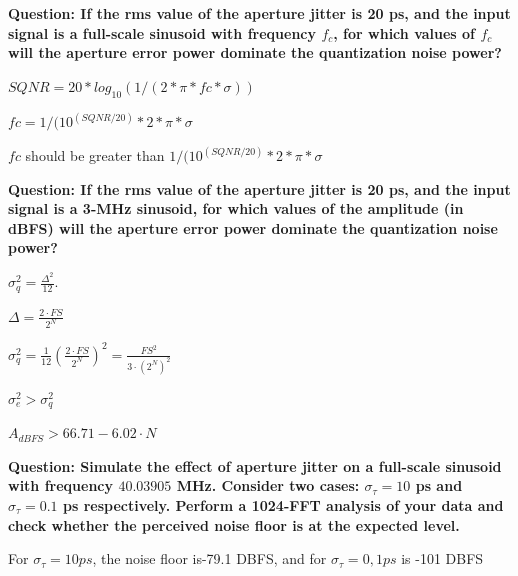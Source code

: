 \textbf{Question: If the rms value of the aperture jitter is 20 ps, and the input signal is a full-scale sinusoid with frequency $f_c$,
    for which values of $f_c$ will the aperture error power dominate the quantization noise power?
}
\vspace{0.5cm}

$SQNR = 20 * log_{10}(1 / (2*\pi*fc*\sigma))$

$fc = 1 / ( 10^(SQNR / 20) * 2*\pi*\sigma $

$fc$ should be greater than $1 / ( 10^(SQNR / 20) * 2*\pi*\sigma $

\vspace{1cm}
\textbf{Question: If the rms value of the aperture jitter is 20 ps, and the input signal is a 3-MHz sinusoid, for which values of the amplitude
    (in dBFS) will the aperture error power dominate the quantization noise power?
}
\vspace{0.5cm}

$\sigma_{q}^{2}=\frac{\Delta^{2}}{12}$.

$\Delta=\frac{2\cdot FS}{2^{N}}$

$\sigma_{q}^{2} = \frac{1}{12} \left( \frac{2 \cdot FS}{2^N} \right)^2 = \frac{FS^2}{3 \cdot (2^N)^2}$

$\sigma_e^2 > \sigma_q^2$

$A_{dBFS} > 66.71 - 6.02 \cdot N$


\vspace{1cm}
\textbf{Question: Simulate the effect of aperture jitter on a full-scale sinusoid with frequency $40.03905$ MHz.
    Consider two cases: $\sigma_\tau = 10$ ps and $\sigma_\tau=0.1$ ps respectively.
    Perform a 1024-FFT analysis of your data and check whether the perceived noise floor is at the expected level.
}
\vspace{0.5cm}

For $\sigma_\tau = 10ps$, the noise floor is-79.1 DBFS, and for  $\sigma_\tau = 0,1ps$ is -101 DBFS


